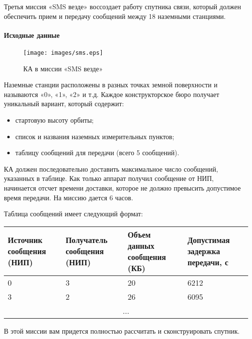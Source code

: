 \documentclass[12pt,a4paper]{article}
\begin{document}
Третья миссия «SMS везде» воссоздает работу спутника связи, который должен обеспечить
прием и передачу сообщений между 18 наземными станциями.

\paragraph{Исходные данные}

\begin{figure}[tbh]
  \begin{center}
    \texttt{[image: images/sms.eps]}
    \caption{КА в миссии «SMS везде»}
    \label{Pic:SMS}
  \end{center}
\end{figure}

Наземные станции расположены в разных точках земной поверхности и называются «0», «1», «2»
и т.д. Каждое конструкторское бюро получает уникальный вариант, который содержит:

\begin{itemize}
\item стартовую высоту орбиты;
\item список и названия наземных измерительных пунктов;
\item таблицу сообщений для передачи (всего 5 сообщений).
\end{itemize}

КА должен последовательно доставить максимальное число сообщений, указанных в таблице. Как
только аппарат получил сообщение от НИП, начинается отсчет времени доставки, которое не
должно превысить допустимое время передачи. На миссию дается 6 часов.

Таблица сообщений имеет следующий формат:

\begin{center}
  \begin{tabular}{|p{3.5cm}|p{3.5cm}|p{3.5cm}|p{3.5cm}|}
    \hline
    \textbf{Источник сообщения (НИП)} & \textbf{Получатель сообщения (НИП)} &
    \textbf{Объем данных сообщения (КБ)} & \textbf{Допустимая задержка передачи, с}\\
    \hline
    0 & 3 & 20 & 6212\\
    \hline
    3 & 2 & 26 & 6095\\
    \hline
    \multicolumn{4}{|c|}{...}\\
    \hline
  \end{tabular}
\end{center}

В этой миссии вам придется полностью рассчитать и сконструировать спутник. 
\end{document}

